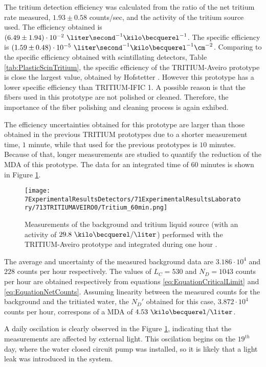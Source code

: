The tritium detection efficiency was calculated from the ratio of the net tritium rate measured, $1.93 \pm 0.58$ counts/sec, and the activity of the tritium source used. The efficiency obtained is $(6.49 \pm 1.94)\cdot{} 10^{-2}~\liter\second^{-1}\kilo\becquerel^{-1}$.  The specific efficiency is $(1.59 \pm 0.48)\cdot{} 10^{-5}~\liter\second^{-1}\kilo\becquerel^{-1}\cm^{-2}$. Comparing to the specific efficiency obtained with scintillating detectors, Table \ref{tab:PlasticScinTritium}, the specific efficiency of the TRITIUM-Aveiro prototype is close the largest value, obtained by Hofstetter \cite{Hofstetter1, Hofstetter2}. However this prototype has a lower specific efficiency than TRITIUM-IFIC 1. A possible reason is that the fibers used in this prototype are not polished or cleaned. Therefore, the importance of the fiber polishing and cleaning process is again exhibed.

The efficiency uncertainties obtained for this prototype are larger than those obtained in the previous TRITIUM prototypes due to a shorter measurement time, $1$ minute, while that used for the previous prototypes is $10$ minutes. Because of that, longer measurements are studied to quantify the reduction of the MDA of this prototype. The data for an integrated time of $60$ minutes is shown in Figure \ref{fig:Tritium60min}.

\begin{figure}[h]
\centering
\texttt{[image: 7ExperimentalResultsDetectors/71ExperimentalResultsLaboratory/713TRITIUMAVEIRO0/Tritium\_60min.png]}
\caption{Measurements of the background and tritium liquid source (with an activity of $29.8~\kilo\becquerel/\liter$) performed with the TRITIUM-Aveiro prototype and integrated during one hour \cite{ExperimentalPaperCarlos}.\label{fig:Tritium60min}}
\end{figure}

The average and uncertainty of the measured background data are $3.186 \cdot{} 10^{4}$ and $228$ counts per hour respectively. The values of $L_C=530$ and $N_D=1043$ counts per hour are obtained respectively from equations \ref{eq:EquationCriticalLimit} and \ref{eq:EquationNetCounts}. Assuming linearity between the measured counts for the background and the tritiated water, the $N_D'$ obtained for this case, $3.872\cdot{}10^4$ counts per hour,  correspons of a MDA of $4.53~\kilo\becquerel/\liter$.

A daily oscilation is clearly observed in the Figure \ref{fig:Tritium60min}, indicating that the measurements are affected by external light. This oscilation begins on the $19^{th}$ day, where the water closed circuit pump was installed, so it is likely that a light leak was introduced in the system.







